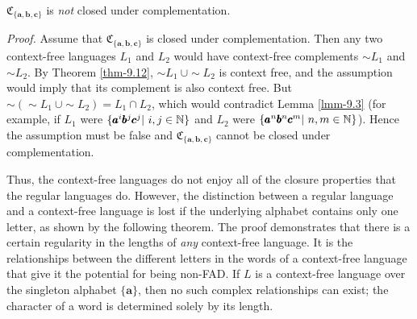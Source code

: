 \begin{lmm}\label{lmm-9.4}
$\mathfrak{C}_{\{\pmb{a},\pmb{b},\pmb{c}\}}$ is \emph{not} closed under
complementation.

\emph{Proof.} Assume that $\mathfrak{C}_{\{\pmb{a},\pmb{b},\pmb{c}\}}$ is closed
under complementation. Then any two context-free languages $L_1$ and $L_2$ would
have context-free complements $\sim  L_1$ and $\sim  L_2$. By Theorem \ref{thm-9.12},
$\sim  L_1\ \cup \sim  L_2$ is context free, and the assumption would imply
that its complement is also context free. But $\sim  (\sim  L_1\ \cup\sim  
L_2)=L_1\cap L_2$, which would contradict Lemma \ref{lmm-9.3} (for example, if $L_1$ were
$\{\pmb{a}^i\pmb{b}^j\pmb{c}^j|\ i,j\in\NN\}$ and $L_2$ were $\{\pmb{a}^n\pmb{b}^n
\pmb{c}^m|\ n,m\in\mathbb{N}\}$). Hence the assumption must be false and $\mathfrak{C}_{
\{\pmb{a},\pmb{b},\pmb{c}\}}$ cannot be closed under complementation.
\end{lmm}

Thus, the context-free languages do not enjoy all of the closure properties that
the regular languages do. However, the distinction between a regular language
and a context-free language is lost if the underlying alphabet contains only one
letter, as shown by the following theorem. The proof demonstrates that there is
a certain regularity in the lengths of \emph{any} context-free language. It is
the relationships between the different letters in the words of a context-free
language that give it the potential for being non-FAD. If $L$ is a context-free
language over the singleton alphabet $\{\pmb{a}\}$, then no such complex
relationships can exist; the character of a word is determined solely by its
length.


